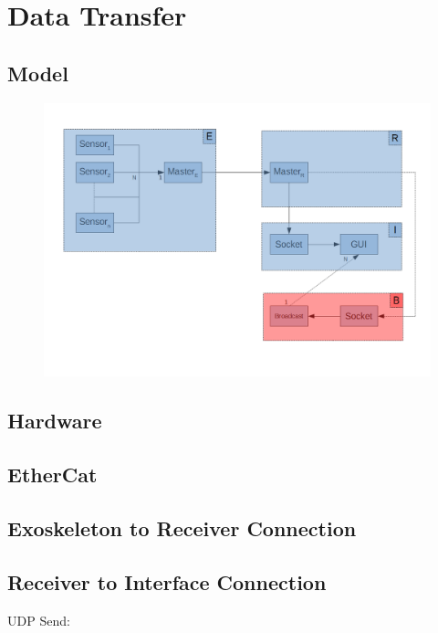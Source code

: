 \section{Data Transfer}
\subsection{Model}
\begin{figure}[!hg]
	\includegraphics[width=500px]{ERBI-Model}
\end{figure}
\subsection{Hardware}
\subsection{EtherCat}
\subsection{Exoskeleton to Receiver Connection}
\subsection{Receiver to Interface Connection}
UDP Send: \cite{web:UDPSend}